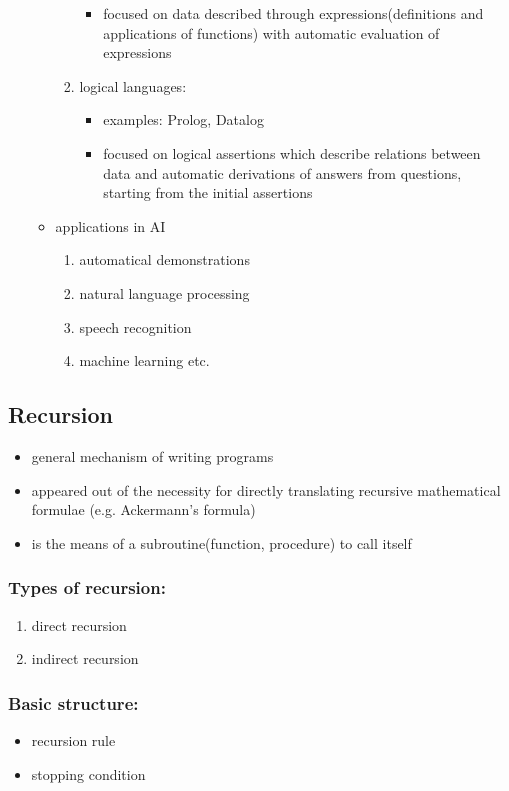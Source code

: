 \documentclass[11pt]{article}
\begin{document}
\begin{enumerate}
\begin{itemize}
\begin{enumerate}
\begin{itemize}
\item focused on data described through expressions(definitions and applications of functions) with automatic evaluation of expressions
\end{itemize}
\item logical languages:
\begin{itemize}
\item examples: Prolog, Datalog
\item focused on logical assertions which describe relations between data and automatic derivations of answers from questions, starting from the initial assertions
\end{itemize}
\end{enumerate}
\item applications in AI
\begin{enumerate}
\item automatical demonstrations
\item natural language processing
\item speech recognition
\item machine learning etc.
\end{enumerate}
\end{itemize}
\end{enumerate}
\subsection{Recursion}
\label{sec:org24d7612}
\begin{itemize}
\item general mechanism of writing programs
\item appeared out of the necessity for directly translating recursive mathematical formulae (e.g. Ackermann's formula)
\item is the means of a subroutine(function, procedure) to call itself
\end{itemize}
\subsubsection{Types of recursion:}
\label{sec:org586ee26}
\begin{enumerate}
\item direct recursion
\item indirect recursion
\end{enumerate}
\subsubsection{Basic structure:}
\label{sec:org8e7005d}
\begin{itemize}
\item recursion rule
\item stopping condition
\end{itemize}
\end{document}
